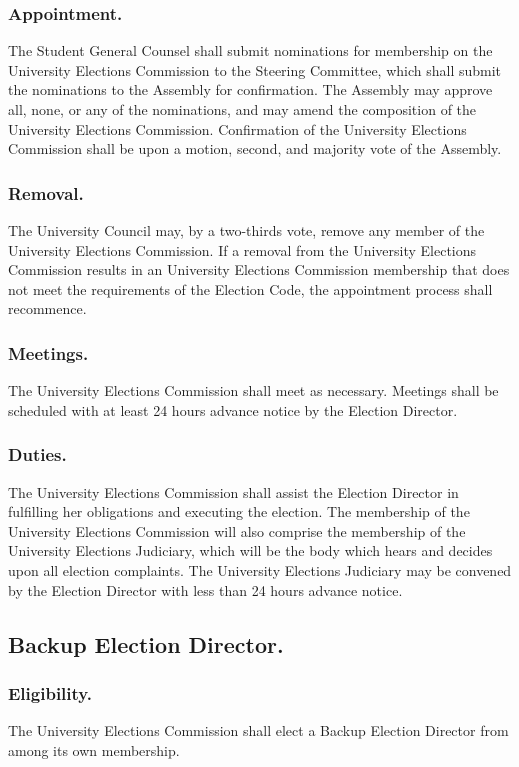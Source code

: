 \subsubsection{Appointment.}
The Student General Counsel shall submit nominations for membership on the University Elections Commission to the Steering Committee, which shall submit the nominations to the Assembly for confirmation.  The Assembly may approve all, none, or any of the nominations, and may amend the composition of the University Elections Commission.  Confirmation of the University Elections Commission shall be upon a motion, second, and majority vote of the Assembly.

\subsubsection{Removal.}
The University Council may, by a two-thirds vote, remove any member of the University Elections Commission.  If a removal from the University Elections Commission results in an University Elections Commission membership that does not meet the requirements of the Election Code, the appointment process shall recommence.

\subsubsection{Meetings.}
The University Elections Commission shall meet as necessary.  Meetings shall be scheduled with at least 24 hours advance notice by the Election Director.

\subsubsection{Duties.}
\subsubsubsection{}
The University Elections Commission shall assist the Election Director in fulfilling her obligations and executing the election.
\subsubsubsection{}
The membership of the University Elections Commission will also comprise the membership of the University Elections Judiciary, which will be the body which hears and decides upon all election complaints.  The University Elections Judiciary may be convened by the Election Director with less than 24 hours advance notice.

\subsection{Backup Election Director.}

\subsubsection{Eligibility.}
The University Elections Commission shall elect a Backup Election Director from among its own membership.
